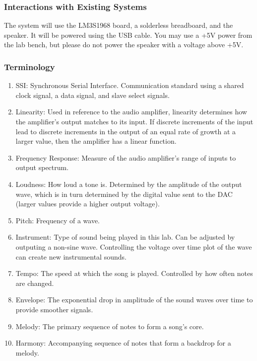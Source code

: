 \documentclass[twoside]{article}
\begin{document}
\subsubsection*{Interactions with Existing Systems}
 The system will use the LM3S1968 board, a solderless breadboard, and the speaker. It will be powered using the USB cable. You may use a +5V power from the lab bench, but please do not power the speaker with a voltage above +5V. 
 
\subsubsection*{Terminology}
 	\begin{enumerate}
    	\item SSI: Synchronous Serial Interface. Communication standard using a shared clock signal, a data signal, and slave select signals.
        \item Linearity: Used in reference to the audio amplifier, linearity determines how the amplifier's output matches to its input. If discrete increments of the input lead to discrete increments in the output of an equal rate of growth at a larger value, then the amplifier has a linear function.
        \item Frequency Response: Measure of the audio amplifier's range of inputs to output spectrum.
        \item Loudness: How loud a tone is. Determined by the amplitude of the output wave, which is in turn determined by the digital value sent to the DAC (larger values provide a higher output voltage).
        \item Pitch: Frequency of a wave.
        \item Instrument: Type of sound being played in this lab. Can be adjusted by outputing a non-sine wave. Controlling the voltage over time plot of the wave can create new instrumental sounds.
        \item Tempo: The speed at which the song is played. Controlled by how often notes are changed.
        \item Envelope: The exponential drop in amplitude of the sound waves over time to provide smoother signals.
        \item Melody: The primary sequence of notes to form a song's core.
        \item Harmony: Accompanying sequence of notes that form a backdrop for a melody.
	\end{enumerate}
 
\end{document}

